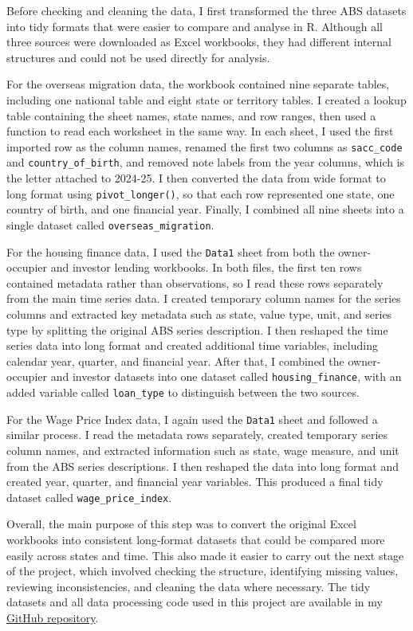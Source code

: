 \documentclass[
  11pt,
  a4paper,
]{article}
\begin{document}
Before checking and cleaning the data, I first transformed the three ABS
datasets into tidy formats that were easier to compare and analyse in R.
Although all three sources were downloaded as Excel workbooks, they had
different internal structures and could not be used directly for
analysis.

For the overseas migration data, the workbook contained nine separate
tables, including one national table and eight state or territory
tables. I created a lookup table containing the sheet names, state
names, and row ranges, then used a function to read each worksheet in
the same way. In each sheet, I used the first imported row as the column
names, renamed the first two columns as \texttt{sacc\_code} and
\texttt{country\_of\_birth}, and removed note labels from the year
columns, which is the letter attached to 2024-25. I then converted the
data from wide format to long format using \texttt{pivot\_longer()}, so
that each row represented one state, one country of birth, and one
financial year. Finally, I combined all nine sheets into a single
dataset called \texttt{overseas\_migration}.

For the housing finance data, I used the \texttt{Data1} sheet from both
the owner-occupier and investor lending workbooks. In both files, the
first ten rows contained metadata rather than observations, so I read
these rows separately from the main time series data. I created
temporary column names for the series columns and extracted key metadata
such as state, value type, unit, and series type by splitting the
original ABS series description. I then reshaped the time series data
into long format and created additional time variables, including
calendar year, quarter, and financial year. After that, I combined the
owner-occupier and investor datasets into one dataset called
\texttt{housing\_finance}, with an added variable called
\texttt{loan\_type} to distinguish between the two sources.

For the Wage Price Index data, I again used the \texttt{Data1} sheet and
followed a similar process. I read the metadata rows separately, created
temporary series column names, and extracted information such as state,
wage measure, and unit from the ABS series descriptions. I then reshaped
the data into long format and created year, quarter, and financial year
variables. This produced a final tidy dataset called
\texttt{wage\_price\_index}.

Overall, the main purpose of this step was to convert the original Excel
workbooks into consistent long-format datasets that could be compared
more easily across states and time. This also made it easier to carry
out the next stage of the project, which involved checking the
structure, identifying missing values, reviewing inconsistencies, and
cleaning the data where necessary. The tidy datasets and all data
processing code used in this project are available in my
\href{https://github.com/ruby910113/FIT5147-DEP-report}{GitHub
repository}.
\end{document}
